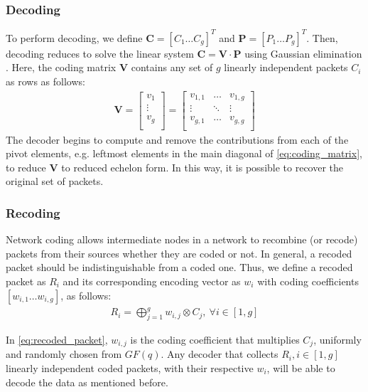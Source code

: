 \subsubsection{Decoding}
To perform decoding, we define $\textbf{C} = \left[C_1 \ldots C_g \right]^T$
and $\textbf{P} = \left[P_1 \ldots P_g \right]^T$. Then, decoding
reduces to solve the linear system $\textbf{C} = \textbf{V} \cdot \textbf{P}$
using Gaussian elimination \cite{fragouli2006network}.
Here, the coding matrix $\textbf{V}$ contains any set of $g$ linearly
independent packets $C_i$ as rows as follows:
%
\begin{align} \label{eq:coding_matrix}
\textbf{V} =
\left[
\begin{array}{c}
        v_1    \\ \hline
        \vdots \\ \hline
        v_g    \\
\end{array}
\right]
=
\left[
\begin{array}{ccc}
        v_{1,1} & \ldots & v_{1,g} \\
        \vdots  & \ddots & \vdots  \\
        v_{g,1} & \ldots & v_{g,g} \\
\end{array}
\right]
\end{align}
%
The decoder begins to compute and remove the contributions from each
of the pivot elements, e.g. leftmost elements in the main diagonal of
\eqref{eq:coding_matrix}, to reduce $\textbf{V}$ to reduced echelon
form. In this way, it is possible to recover the original set of packets.

\subsubsection{Recoding}
Network coding allows intermediate nodes in a network to
recombine (or recode) packets from their sources whether they are
coded or not. In general, a recoded packet should be indistinguishable
from a coded one. Thus, we define a recoded packet as
$R_i$ and its corresponding encoding vector as
$w_i$ with coding coefficients $ \left[w_{i,1} \ldots w_{i,g} \right]$,
as follows:
%
\begin{align}
\label{eq:recoded_packet}
R_i = \bigoplus_{j=1}^{g} w_{i,j} \otimes C_j  ,\ \forall i \in [1,g]
\end{align}

In \eqref{eq:recoded_packet}, $w_{i,j}$ is the coding coefficient that
multiplies $C_j$, uniformly and randomly chosen from $GF(q)$. Any
decoder that collects $R_i, i \in [1,g]$ linearly independent coded packets,
with their respective $w_i$, will be able to decode the data as mentioned
before.

